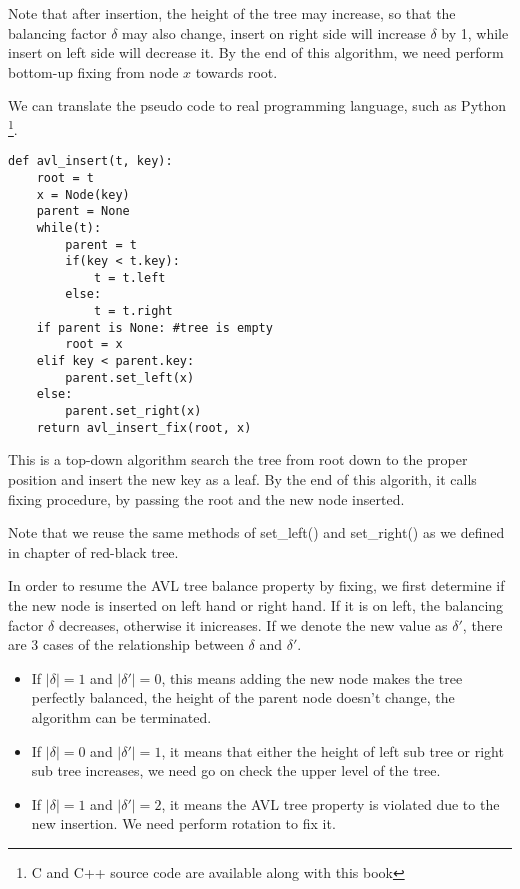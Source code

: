 \documentclass{article}
\begin{document}
Note that after insertion, the height of the tree may increase, so that
the balancing factor $\delta$ may also change, insert on right side will
increase $\delta$ by 1, while insert on left side will decrease it. By 
the end of this algorithm, we need perform bottom-up fixing from node $x$
towards root.

We can translate the pseudo code to real programming language, such as 
Python \footnote{C and C++ source code are available along with this book}. 
\lstset{language=Python}
\begin{lstlisting}
def avl_insert(t, key):
    root = t
    x = Node(key)
    parent = None
    while(t):
        parent = t
        if(key < t.key):
            t = t.left
        else:
            t = t.right
    if parent is None: #tree is empty
        root = x
    elif key < parent.key:
        parent.set_left(x)
    else:
        parent.set_right(x)
    return avl_insert_fix(root, x)
\end{lstlisting}

This is a top-down algorithm search the tree from root down to the proper
position and insert the new key as a leaf. By the end of this algorith, it calls fixing procedure, by passing the root and the new node inserted.

Note that we reuse the same methods of set\_left() and set\_right() as
we defined in chapter of red-black tree.

In order to resume the AVL tree balance property by fixing, we first determine if the new node is inserted on left hand or right hand. If it is on left, the balancing factor $\delta$ decreases, otherwise it inicreases. If we denote the new value as $\delta'$, there are 3 cases of the relationship between $\delta$ and $\delta'$.

\begin{itemize}
\item If $|\delta| = 1$ and $|\delta'| = 0$, this means adding the new node makes the tree perfectly balanced, the height of the parent node doesn't change, the algorithm can be terminated.

\item If $|\delta| = 0$ and $|\delta'| = 1$, it means that either the height of left sub tree or right sub tree increases, we need go on check the upper level of the tree.

\item If $|\delta| = 1$ and $|\delta'| = 2$, it means the AVL tree property is violated due to the new insertion. We need perform rotation to fix it.
\end{itemize}
\end{document}
